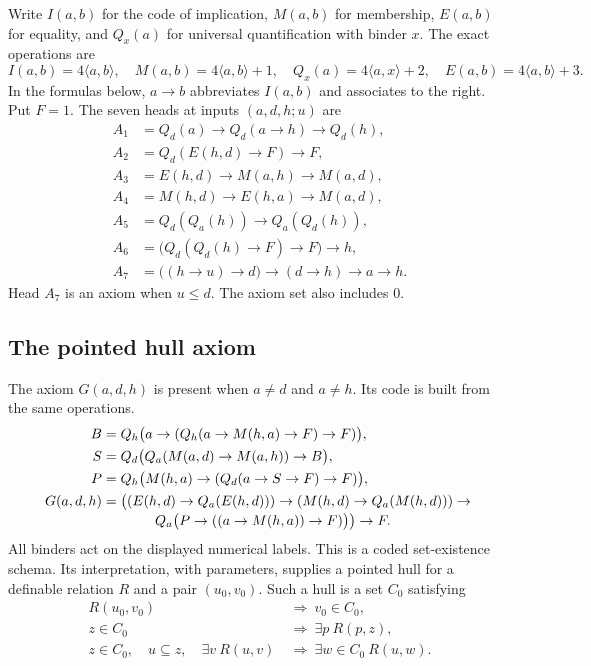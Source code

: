 \documentclass[11pt,letterpaper]{article}
\newcommand{\pair}[2]{\langle #1,#2\rangle}
\begin{document}
Write $I(a,b)$ for the code of implication, $M(a,b)$ for membership,
$E(a,b)$ for equality, and $Q_x(a)$ for universal quantification with
binder $x$. The exact operations are
\[
 I(a,b)=4\pair{a}{b},\quad M(a,b)=4\pair{a}{b}+1,\quad
 Q_x(a)=4\pair{a}{x}+2,\quad E(a,b)=4\pair{a}{b}+3 .
\]
In the formulas below, $a\to b$ abbreviates $I(a,b)$ and associates to
the right. Put $F=1$. The seven heads at inputs $(a,d,h;u)$ are
\begin{align*}
 A_1 &= Q_d(a)\to Q_d(a\to h)\to Q_d(h),\\
 A_2 &= Q_d(E(h,d)\to F)\to F,\\
 A_3 &= E(h,d)\to M(a,h)\to M(a,d),\\
 A_4 &= M(h,d)\to E(h,a)\to M(a,d),\\
 A_5 &= Q_d(Q_a(h))\to Q_a(Q_d(h)),\\
 A_6 &= \bigl(Q_d(Q_d(h)\to F)\to F\bigr)\to h,\\
 A_7 &= \bigl((h\to u)\to d\bigr)\to(d\to h)\to a\to h .
\end{align*}
Head $A_7$ is an axiom when $u\le d$. The axiom set also includes $0$.

\subsection{The pointed hull axiom}

The axiom $G(a,d,h)$ is present when $a\ne d$ and $a\ne h$.
Its code is built from the same operations.
\begin{align*}
 B &= Q_h\bigl(a\to (Q_h(a\to M(h,a)\to F)\to F)\bigr),\\
 S &= Q_d\bigl(Q_a(M(a,d)\to M(a,h))\to B\bigr),\\
 P &= Q_h\bigl(M(h,a)\to (Q_d(a\to S\to F)\to F)\bigr),\\
 G(a,d,h)
   &= \bigl((E(h,d)\to Q_a(E(h,d)))\to
          (M(h,d)\to Q_a(M(h,d)))\to {}\\[-2pt]
   &\hspace{3.8em} Q_a\bigl(P\to((a\to M(h,a))\to F)\bigr)\bigr)\to F .
\end{align*}
All binders act on the displayed numerical labels. This is a coded
set-existence schema. Its interpretation, with parameters, supplies a
pointed hull for a definable relation $R$ and a pair $(u_0,v_0)$.
Such a hull is a set $C_0$ satisfying
\[
\begin{split}
 R(u_0,v_0)&\ \Longrightarrow\ v_0\in C_0,\\
 z\in C_0&\ \Longrightarrow\ \exists p\ R(p,z),\\
 z\in C_0,\quad u\subseteq z,\quad \exists v\ R(u,v)
    &\ \Longrightarrow\ \exists w\in C_0\ R(u,w).
\end{split}
\]
\end{document}
